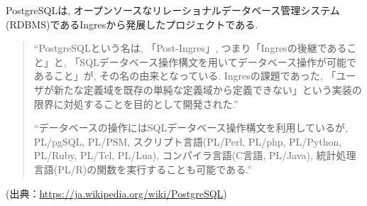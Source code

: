 PostgreSQLは, オープンソースなリレーショナルデータベース管理システム(RDBMS)であるIngresから発展したプロジェクトである.

\begin{quotation}
“PostgreSQLという名は, 「Post-Ingres」, つまり「Ingresの後継であること」と, 「SQLデータベース操作構文を用いてデータベース操作が可能であること」が, その名の由来となっている.
Ingresの課題であった, 「ユーザが新たな定義域を既存の単純な定義域から定義できない」という実装の限界に対処することを目的として開発された.”

“データベースの操作にはSQLデータベース操作構文を利用しているが, PL/pgSQL, PL/PSM, スクリプト言語(PL/Perl, PL/php, PL/Python, PL/Ruby, PL/Tcl, PL/Lua), コンパイラ言語(C言語, PL/Java), 統計処理言語(PL/R)の関数を実行することも可能である.”
\end{quotation}
\begin{flushright}
(出典：\url{https://ja.wikipedia.org/wiki/PostgreSQL})
\end{flushright}

